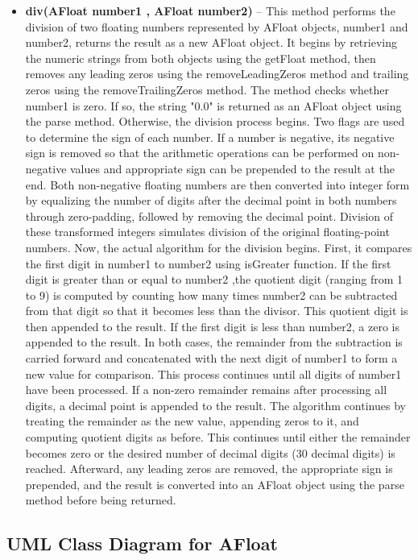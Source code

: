 \documentclass[a4paper,12pt]{article}
\begin{document}
\begin{itemize}
    \item \textbf{div(AFloat number1 , AFloat number2)} -- This method performs the division of two floating numbers represented by AFloat objects, number1 and number2, returns the result as a new AFloat object. It begins by retrieving the numeric strings from both objects using the getFloat method, then removes any leading zeros using the removeLeadingZeros method and trailing zeros using the removeTrailingZeros method. The method checks whether number1 is zero. If so, the string "0.0" is returned as an AFloat object using the parse method. Otherwise, the division process begins. Two flags are used to determine the sign of each number. If a number is negative, its negative sign is removed so that the arithmetic operations can be performed on non-negative values and appropriate sign can be prepended to the result at the end. Both non-negative floating numbers are then converted into integer form by equalizing the number of digits after the decimal point in both numbers through zero-padding, followed by removing the decimal point. Division of these transformed integers simulates division of the original floating-point numbers. Now, the actual algorithm for the division begins. First, it compares the first digit in number1 to number2 using isGreater function. If the first digit is greater than or equal to number2 ,the quotient digit (ranging from 1 to 9) is computed by counting how many times number2 can be subtracted from that digit so that it becomes less than the divisor. This quotient digit is then appended to the result. If the first digit is less than number2, a zero is appended to the result. In both cases, the remainder from the subtraction is carried forward and concatenated with the next digit of number1 to form a new value for comparison. This process continues until all digits of number1 have been processed. If a non-zero remainder remains after processing all digits, a decimal point is appended to the result. The algorithm continues by treating the remainder as the new value, appending zeros to it, and computing quotient digits as before. This continues until either the remainder becomes zero or the desired number of decimal digits (30 decimal digits) is reached. Afterward, any leading zeros are removed, the appropriate sign is prepended, and the result is converted into an AFloat object using the parse method before being returned.\\
\end{itemize}

\subsection{UML Class Diagram for AFloat}
\end{document}
